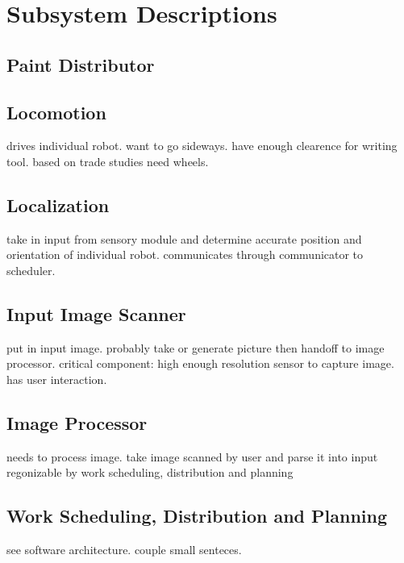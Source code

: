 
\section{Subsystem Descriptions}
\label{sec:subsystem_descriptions}




\subsection{Paint Distributor}
\label{sec:subsystem_paint_distributor}

\subsection{Locomotion}
\label{sec:subsystem_locomotion}
drives individual robot. want to go sideways. have enough clearence for writing tool. based on trade studies need wheels.

\subsection{Localization}
\label{sec:subsystem_localization}
take in input from sensory module and determine accurate position and orientation of individual robot. communicates through communicator to scheduler.

\subsection{Input Image Scanner}
\label{sec:subsystem_input_scanner}
put in input image. probably take or generate picture then handoff to image processor. critical component: high enough resolution sensor to capture image. has user interaction.

\subsection{Image Processor}
\label{sec:subsystem_image_processor}
needs to process image. take image scanned by user and parse it into input regonizable by work scheduling, distribution and planning

\subsection{Work Scheduling, Distribution and Planning}
\label{sec:subsystem_planner}
see software architecture. couple small senteces.

